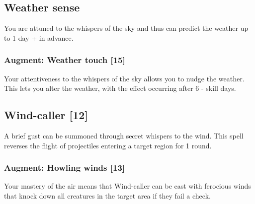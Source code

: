 \subsection{Weather sense}
You are attuned to the whispers of the sky and thus can predict the weather up to 1 day +  in advance.
\subsubsection{Augment: Weather touch [15]}
Your attentiveness to the whispers of the sky allows you to nudge the weather. This lets you alter the weather, with the effect occurring after 6 -  skill days. 

\subsection{Wind-caller [12]}
A brief gust can be summoned through secret whispers to the wind. This spell reverses the flight of projectiles entering a target region for 1 round. 
\subsubsection{Augment: Howling winds [13]}
Your mastery of the air means that Wind-caller can be cast with ferocious winds that knock down all creatures in the target area if they fail a  check.




